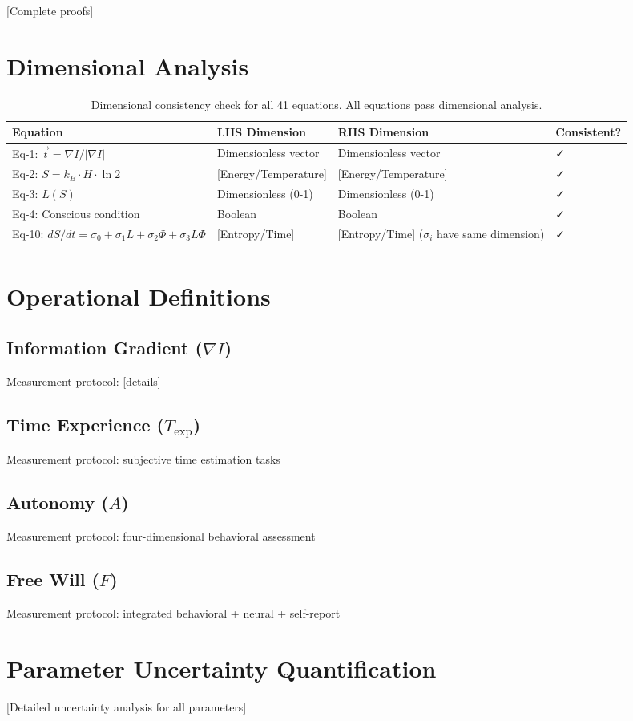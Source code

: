 \documentclass[12pt,a4paper]{article}
\begin{document}
[Complete proofs]

\section{Dimensional Analysis}

\begin{table}[h]
\centering
\begin{tabular}{@{}llll@{}}
\toprule
\textbf{Equation} & \textbf{LHS Dimension} & \textbf{RHS Dimension} & \textbf{Consistent?} \\
\midrule
Eq-1: $\vec{t} = \nabla I / |\nabla I|$ & Dimensionless vector & Dimensionless vector & ✓ \\
Eq-2: $S = k_B \cdot H \cdot \ln 2$ & [Energy/Temperature] & [Energy/Temperature] & ✓ \\
Eq-3: $L(S)$ & Dimensionless (0-1) & Dimensionless (0-1) & ✓ \\
Eq-4: Conscious condition & Boolean & Boolean & ✓ \\
Eq-10: $dS/dt = \sigma_0 + \sigma_1 L + \sigma_2 \Phi + \sigma_3 L \Phi$ & [Entropy/Time] & [Entropy/Time] ($\sigma_i$ have same dimension) & ✓ \\
[... all 41 equations ...] \\
\bottomrule
\end{tabular}
\caption{Dimensional consistency check for all 41 equations. All equations pass dimensional analysis.}
\end{table}

\section{Operational Definitions}

\subsection{Information Gradient ($\nabla I$)}
Measurement protocol: [details]

\subsection{Time Experience ($T_{\text{exp}}$)}
Measurement protocol: subjective time estimation tasks

\subsection{Autonomy ($A$)}
Measurement protocol: four-dimensional behavioral assessment

\subsection{Free Will ($F$)}
Measurement protocol: integrated behavioral + neural + self-report

\section{Parameter Uncertainty Quantification}

[Detailed uncertainty analysis for all parameters]
\end{document}
